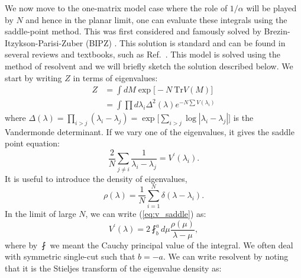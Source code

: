 \documentclass[letter,11pt]{article}
\begin{document}
We now move to the one-matrix model case where the role of $1/\alpha$ will be played by $N$ and hence in the planar limit, one can evaluate these integrals using the saddle-point method. This was first considered and famously solved by Brezin-Itzykson-Parisi-Zuber (BIPZ) \cite{Brezin:1977sv}. This solution is standard and can be found in several reviews and textbooks, such as Ref.~\cite{DiFrancesco:1993cyw, Marino:2004eq, 2002mcgt.book.....M}. This model is solved using the method of resolvent
and we will briefly sketch the solution described below. We start by writing $Z$ in terms of eigenvalues:
\begin{align}
	Z &= \int dM \exp\Big[-N~\mbox{Tr} V(M)\Big] \\
	& = \int \prod d\lambda_{i} \Delta^2(\lambda)  e^{-N \sum V(\lambda_i)} 
\end{align}
where $\Delta(\lambda) = \prod_{i > j} (\lambda_i - \lambda_j) = \exp\Big[\sum_{i>j} \log |\lambda_{i} - \lambda_{j}|\Big]$ is the Vandermonde 
determinant. If we vary one of the eigenvalues, it gives the saddle point equation:
\begin{equation}
	\label{eq:v_saddle}
	\frac{2}{N} \sum_{j \neq i} \frac{1}{\lambda_i - \lambda_j} = V^{\prime}(\lambda_i).
\end{equation}
It is useful to introduce the density of eigenvalues,
\begin{equation}
	\rho(\lambda) = \frac{1}{N} \sum_{i=1}^{N} \delta(\lambda - \lambda_i). 
\end{equation}
In the limit of large $N$, we can write (\ref{eq:v_saddle})
as:
\begin{equation}
	\label{eq:vprime}
	V^{\prime}(\lambda) = 2 \fint_{b}^{a} d\mu \frac{\rho(\mu)}{\lambda - \mu}, 
\end{equation}
where by $\fint$ we meant the Cauchy principal value of the integral. We 
often deal with symmetric single-cut such that $b=-a$. 
We can write resolvent by noting that it is the Stieljes transform of the eigenvalue density as: 
\end{document}
